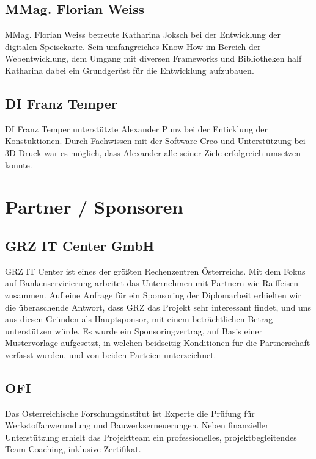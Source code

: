   \subsection*{MMag. Florian Weiss}
  MMag. Florian Weiss betreute Katharina Joksch bei der Entwicklung der digitalen Speisekarte. Sein umfangreiches
  Know-How im Bereich der Webentwicklung, dem Umgang mit diversen Frameworks und Bibliotheken half Katharina
  dabei ein Grundgerüst für die Entwicklung aufzubauen.

  \subsection*{DI Franz Temper}
  DI Franz Temper unterstützte Alexander Punz bei der Enticklung der Konstuktionen. Durch Fachwissen mit
  der Software Creo und Unterstützung bei 3D-Druck war es möglich, dass Alexander alle seiner Ziele erfolgreich
  umsetzen konnte.

\section{Partner / Sponsoren}

\subsection*{GRZ IT Center GmbH}
{GRZ IT Center\cite{grz}} ist eines der größten Rechenzentren Österreichs. Mit dem Fokus auf Bankenservicierung arbeitet das Unternehmen
mit Partnern wie Raiffeisen zusammen. Auf eine Anfrage für ein Sponsoring der Diplomarbeit erhielten wir die überaschende
Antwort, dass GRZ das Projekt sehr interessant findet, und uns aus diesen Gründen als Hauptsponsor, mit einem beträchtlichen Betrag
unterstützen würde.
Es wurde ein Sponsoringvertrag, auf Basis einer Mustervorlage aufgesetzt, in welchen beidseitig Konditionen für die Partnerschaft
verfasst wurden, und von beiden Parteien unterzeichnet.

\subsection*{OFI}
{Das Österreichische Forschungsinstitut\cite{ofi}} ist Experte die Prüfung für Werkstoffanwerundung
und Bauwerkserneuerungen. Neben finanzieller Unterstützung erhielt das Projektteam
ein professionelles, projektbegleitendes Team-Coaching, inklusive Zertifikat.

